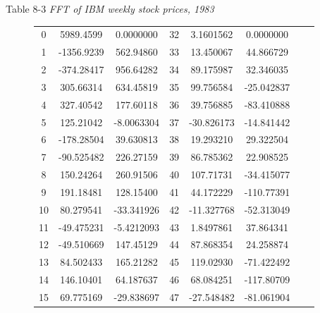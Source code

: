 Table 8-3 \textit{FFT of IBM weekly stock prices, 1983}
\begin{figure}
    \setlength{\tabcolsep}{1em}
    \begin{tabular}{cccccccc}
         0 &  5989.4599 &  0.0000000 & 32 &  3.1601562 &  0.0000000 \\ 
         1 & -1356.9239 &  562.94860 & 33 &  13.450067 &  44.866729 \\
         2 & -374.28417 &  956.64282 & 34 &  89.175987 &  32.346035 \\
         3 &  305.66314 &  634.45819 & 35 &  99.756584 & -25.042837 \\
         4 &  327.40542 &  177.60118 & 36 &  39.756885 & -83.410888 \\
         5 &  125.21042 & -8.0063304 & 37 & -30.826173 & -14.841442 \\
         6 & -178.28504 &  39.630813 & 38 &  19.293210 &  29.322504 \\
         7 & -90.525482 &  226.27159 & 39 &  86.785362 &  22.908525 \\
         8 &  150.24264 &  260.91506 & 40 &  107.71731 & -34.415077 \\
         9 &  191.18481 &  128.15400 & 41 &  44.172229 & -110.77391 \\
        10 &  80.279541 & -33.341926 & 42 & -11.327768 & -52.313049 \\
        11 & -49.475231 & -5.4212093 & 43 &  1.8497861 &  37.864341 \\
        12 & -49.510669 &  147.45129 & 44 &  87.868354 &  24.258874 \\
        13 &  84.502433 &  165.21282 & 45 &  119.02930 & -71.422492 \\
        14 &  146.10401 &  64.187637 & 46 &  68.084251 & -117.80709 \\
        15 &  69.775169 & -29.838697 & 47 & -27.548482 & -81.061904 \\
        

\end{tabular}
\end{figure}
